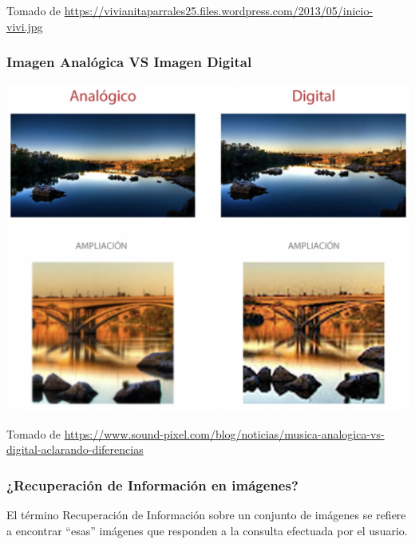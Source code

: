 \documentclass[
10pt, %
aspectratio=169, %
]{beamer}
\begin{document}
\begin{frame}
\begin{minipage}{.55\textwidth}
			{\scriptsize Tomado de \url{https://vivianitaparrales25.files.wordpress.com/2013/05/inicio-vivi.jpg}}
		\end{minipage}
		
	\end{frame}
	
	\begin{frame}
		
		\frametitle{Imagen Analógica VS Imagen Digital}
		
		\centering
		\includegraphics[scale=0.34]{diferencias.png} 
		
		{\scriptsize Tomado de \url{https://www.sound-pixel.com/blog/noticias/musica-analogica-vs-digital-aclarando-diferencias}}
		
	\end{frame}
	
	\begin{frame}
		
		\frametitle{¿Recuperación de Información en imágenes?}
		
		El término Recuperación de Información sobre un conjunto de imágenes se refiere a encontrar ``esas'' imágenes que responden a la consulta efectuada por el usuario.
		
	\end{frame}
	
\end{document}
